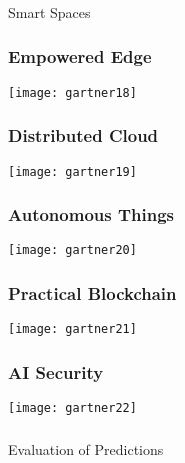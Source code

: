 \begin{frame}[fragile]\frametitle{}
\begin{center}
{\Large Smart Spaces}
\end{center}
\end{frame}

\begin{frame}[fragile]\frametitle{Empowered Edge}
\begin{center}
\texttt{[image: gartner18]}
\end{center}
\end{frame}

\begin{frame}[fragile]\frametitle{Distributed Cloud}
\begin{center}
\texttt{[image: gartner19]}
\end{center}
\end{frame}

\begin{frame}[fragile]\frametitle{Autonomous Things}
\begin{center}
\texttt{[image: gartner20]}
\end{center}
\end{frame}

\begin{frame}[fragile]\frametitle{Practical Blockchain}
\begin{center}
\texttt{[image: gartner21]}
\end{center}
\end{frame}

\begin{frame}[fragile]\frametitle{AI Security}
\begin{center}
\texttt{[image: gartner22]}
\end{center}
\end{frame}

\begin{frame}[fragile]\frametitle{}
\begin{center}
{\Large Evaluation of Predictions}
\end{center}
\end{frame}

